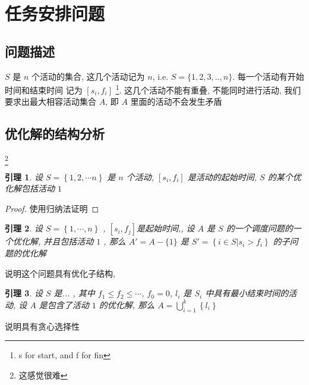 \documentclass[a4paper, 10pt]{ctexart} %
\newtheorem{lemma}{引理}
\begin{document}
\section{任务安排问题}
\subsection{问题描述}
$S$ 是 $n$ 个活动的集合, 这几个活动记为 $n$, i.e. $S = \{ 1,2,3,.. , n \}$. 
每一个活动有开始时间和结束时间 记为 $\left[ s_i , f_i\right]$ \footnote{s for start, and f for fin}. 这几个活动不能有重叠,
不能同时进行活动, 我们要求出最大相容活动集合 $A$, 即 $A$ 里面的活动不会发生矛盾
\subsection{优化解的结构分析}
\footnote{这感觉很难}
\begin{lemma}
    设 $S = \left\{1,2, \cdots  n\right\}$ 是 $n$ 个活动, $\left[ s_i, f_i   \right]$
    是活动的起始时间, $S$ 的某个优化解包括活动 $1$
\end{lemma}
\begin{proof}
    使用归纳法证明
\end{proof}
\begin{lemma}
    设 $S = \left\{ 1, \cdots  ,n   \right\}$ , $\left[ s_i, f_j  \right]$是起始时间,, 
    设 $A$ 是 $S$ 的一个调度问题的一个优化解, 并且包括活动 $1$ , 那么 $A ' = A - \{1\}$ 是 $S ' = \left\{ i \in S| s_i > f_i\right\}$ 的子问题的优化解
\end{lemma}

说明这个问题具有优化子结构, 
\begin{lemma}
    设 $S$ 是... , 其中 $f_1 \le f_2 \le \cdots  $, $f_0 = 0$, $l_i$ 是 $S_i  $ 中具有最小结束时间的活动, 设 $A$ 是包含了活动 $1$ 的优化解, 那么 $A =\bigcup ^{k}_{i=1}\left\{ l_i\right\}$
\end{lemma}
说明具有贪心选择性
\end{document}
